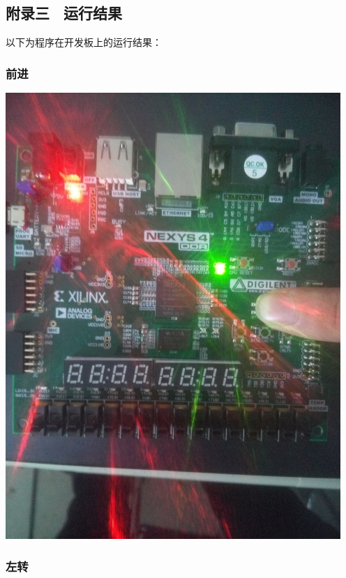 \documentclass[11pt, a4paper]{article}
\begin{document}
\begin{CJK*}{UTF8}{gbsn}
\begin{appendices}

  \subsection*{附录三 \ 运行结果}

  
  以下为程序在开发板上的运行结果：

  \subsubsection*{前进}

  \begin{center}
    \includegraphics[width = 5in]{straight2.jpg}
  \end{center}
  
  \subsubsection*{左转}
  

\end{appendices}
\end{CJK*}
\end{document}
